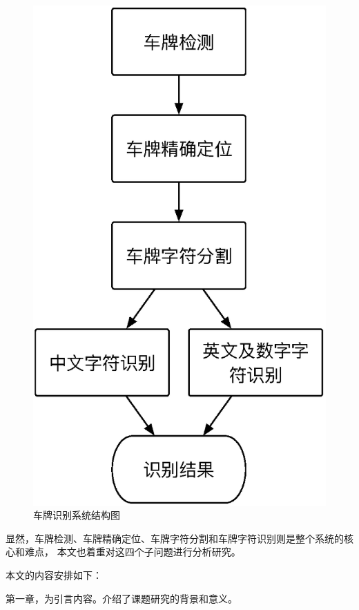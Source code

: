 \begin{figure}[ht]
  \centering
  \includegraphics[height=0.5\textheight, keepaspectratio]{./Figure/SystemArch.eps}
  \caption{车牌识别系统结构图}\label{Fig:SystemArch}
\end{figure}

显然，车牌检测、车牌精确定位、车牌字符分割和车牌字符识别则是整个系统的核心和难点，
本文也着重对这四个子问题进行分析研究。

本文的内容安排如下：

第一章，为引言内容。介绍了课题研究的背景和意义。


